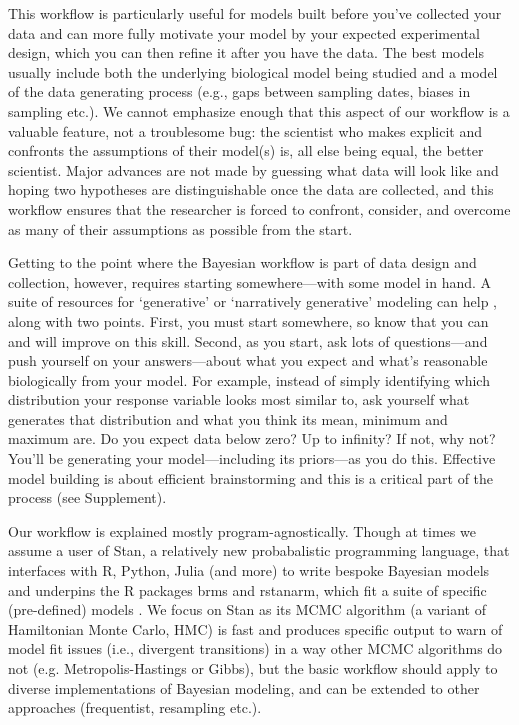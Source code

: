 \documentclass[11pt]{article}
\begin{document}
{This workflow is particularly useful for models built before you've collected your data and can more fully motivate your model by your expected experimental design, which you can then refine it after you have the data. The best models usually include both the underlying biological model being studied and a model of the data generating process (e.g., gaps between sampling dates, biases in sampling etc.). We cannot emphasize enough that this aspect of our workflow is a valuable feature, not a troublesome bug: the scientist who makes explicit and confronts the assumptions of their model(s) is, all else being equal, the better scientist. Major advances are not made by guessing what data will look like and hoping two hypotheses are distinguishable once the data are collected, and this workflow ensures that the researcher is forced to confront, consider, and overcome as many of their assumptions as possible from the start.

Getting to the point where the Bayesian workflow is part of data design and collection, however, requires starting somewhere---with some model in hand. A suite of resources for `generative' or `narratively generative' modeling can help \citep{statrethink,betangen}, along with two points. First, you must start somewhere, so know that you can and will improve on this skill. Second, as you start, ask lots of questions---and push yourself on your answers---about what you expect and what's reasonable biologically from your model. For example, instead of simply identifying which distribution your response variable looks most similar to, ask yourself what generates that distribution and what you think its mean, minimum and maximum are. Do you expect data below zero? Up to infinity? If not, why not? You'll be generating your model---including its priors---as you do this. Effective model building is about efficient brainstorming and this is a critical part of the process (see Supplement). 

Our workflow is explained mostly program-agnostically. Though at times we assume a user of \textsf{Stan}, a relatively new probabalistic programming language, that interfaces with \textsf{R, Python, Julia} (and more) to write bespoke Bayesian models and underpins the \textsf{R} packages \textsf{brms} and \textsf{rstanarm}, which fit a suite of specific (pre-defined) models \citep{Carpenter:2017stan}. We focus on \textsf{Stan} as its MCMC algorithm (a variant of Hamiltonian Monte Carlo, HMC) is fast and produces specific output to warn of model fit issues (i.e., divergent transitions) in a way other MCMC algorithms do not (e.g. Metropolis-Hastings or Gibbs), but the basic workflow should apply to diverse implementations of Bayesian modeling, and can be extended to other approaches (frequentist, resampling etc.). \\

}
\end{document}
